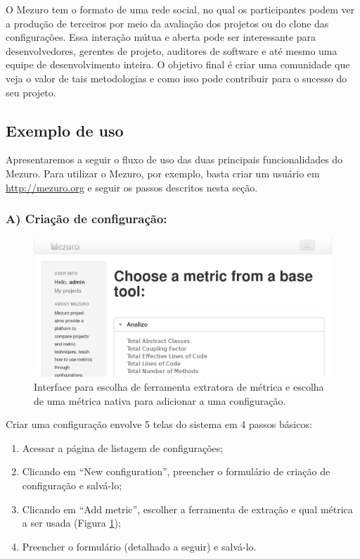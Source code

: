 \documentclass{llncs}
\begin{document}
O Mezuro tem o formato de uma rede social, no qual os participantes podem ver a
produção de terceiros por meio da avaliação dos projetos ou do clone das
configurações. Essa interação mútua e aberta pode ser interessante para
desenvolvedores, gerentes de projeto, auditores de software e até mesmo uma
equipe de desenvolvimento inteira. O objetivo final é criar uma comunidade que
veja o valor de tais metodologias e como isso pode contribuir para o sucesso do
seu projeto.

\subsection{Exemplo de uso}
\label{sec:exemplo-uso}

Apresentaremos a seguir o fluxo de uso das duas principais funcionalidades do
Mezuro. Para utilizar o Mezuro, por exemplo, basta criar um usuário em
{\url{http://mezuro.org}} e seguir os passos descritos nesta seção. 

  \subsubsection{A) Criação de configuração:}

  \begin{figure}[htb]
    \centering
    \includegraphics[width=\textwidth]{images/choose-metric.png}
    \caption{Interface para escolha de ferramenta extratora de métrica e escolha de uma métrica nativa para adicionar a uma configuração.}
    \label{fig:choose-metric}
  \end{figure}

  Criar uma configuração envolve 5 telas do sistema em 4 passos básicos:

  \begin{enumerate}
    \item Acessar a página de listagem de configurações;
    \item Clicando em ``New configuration'', preencher o formulário de criação de configuração e salvá-lo;
    \item Clicando em ``Add metric'', escolher a ferramenta de extração e qual métrica a ser usada (Figura \ref{fig:choose-metric});
    \item Preencher o formulário (detalhado a seguir) e salvá-lo.
  \end{enumerate}
\end{document}
